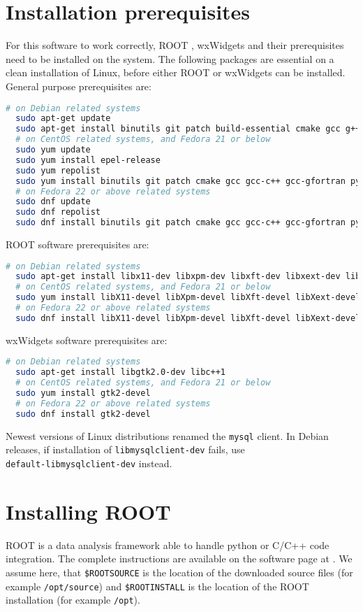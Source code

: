 \documentclass[12pt,a4paper]{report}
\begin{document}
\section{Installation prerequisites}
For this software to work correctly, ROOT \cite{root}, wxWidgets \cite{wxWidgets} and their prerequisites need to be installed on the system. The following packages are essential on a clean installation of Linux, before either ROOT or wxWidgets can be installed. General purpose prerequisites are:
\begin{lstlisting}[language=bash]
  # on Debian related systems
  sudo apt-get update
  sudo apt-get install binutils git patch build-essential cmake gcc g++ gfortran python doxygen python-dev wget
  # on CentOS related systems, and Fedora 21 or below
  sudo yum update
  sudo yum install epel-release
  sudo yum repolist
  sudo yum install binutils git patch cmake gcc gcc-c++ gcc-gfortran python doxygen python-devel wget redhat-lsb-core bzip2
  # on Fedora 22 or above related systems
  sudo dnf update
  sudo dnf repolist
  sudo dnf install binutils git patch cmake gcc gcc-c++ gcc-gfortran python doxygen python-devel wget redhat-lsb-core bzip2
\end{lstlisting}
ROOT software prerequisites are:
\begin{lstlisting}[language=bash]
  # on Debian related systems
  sudo apt-get install libx11-dev libxpm-dev libxft-dev libxext-dev libgsl0-dev libfftw3-dev libmysqlclient-dev libxml2-dev
  # on CentOS related systems, and Fedora 21 or below
  sudo yum install libX11-devel libXpm-devel libXft-devel libXext-devel gsl-devel fftw-devel mysql-devel libxml2-devel
  # on Fedora 22 or above related systems
  sudo dnf install libX11-devel libXpm-devel libXft-devel libXext-devel gsl-devel fftw-devel mysql-devel libxml2-devel
\end{lstlisting}
wxWidgets software prerequisites are:
\begin{lstlisting}[language=bash]
  # on Debian related systems
  sudo apt-get install libgtk2.0-dev libc++1
  # on CentOS related systems, and Fedora 21 or below
  sudo yum install gtk2-devel 
  # on Fedora 22 or above related systems
  sudo dnf install gtk2-devel 
\end{lstlisting}
Newest versions of Linux distributions renamed the \texttt{mysql} client. In Debian releases, if installation of \texttt{libmysqlclient-dev} fails, use \\\texttt{default-libmysqlclient-dev} instead.

\section{Installing ROOT}
ROOT is a data analysis framework able to handle python or C/C++ code integration. The complete instructions are available on the software page at \cite{root}. We assume here, that \texttt{\$ROOTSOURCE} is the location of the downloaded source files (for example \texttt{/opt/source}) and \texttt{\$ROOTINSTALL} is the location of the ROOT installation (for example \texttt{/opt}).
\end{document}
